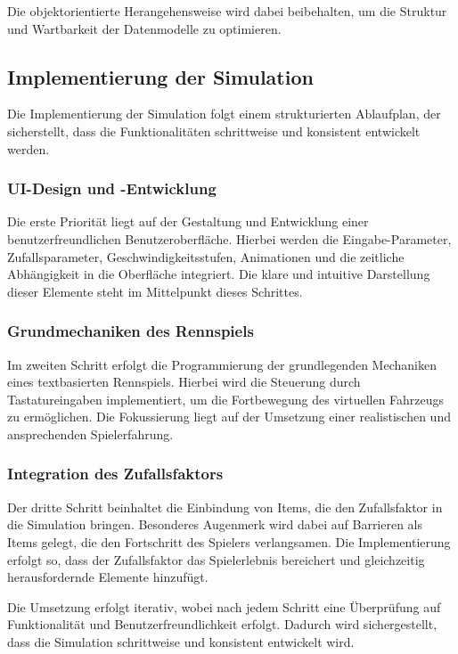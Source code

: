 \documentclass[hidelinks,12pt]{article}
\begin{document}
Die objektorientierte Herangehensweise wird dabei beibehalten, um die Struktur und Wartbarkeit der Datenmodelle zu optimieren.

\subsection{Implementierung der Simulation}
Die Implementierung der Simulation folgt einem strukturierten Ablaufplan, der sicherstellt, dass die Funktionalitäten schrittweise und konsistent entwickelt werden.

\subsubsection{UI-Design und -Entwicklung}
Die erste Priorität liegt auf der Gestaltung und Entwicklung einer benutzerfreundlichen Benutzeroberfläche. Hierbei werden die Eingabe-Parameter, Zufallsparameter, Geschwindigkeitsstufen, Animationen und die zeitliche Abhängigkeit in die Oberfläche integriert. Die klare und intuitive Darstellung dieser Elemente steht im Mittelpunkt dieses Schrittes.

\subsubsection{Grundmechaniken des Rennspiels}
Im zweiten Schritt erfolgt die Programmierung der grundlegenden Mechaniken eines textbasierten Rennspiels. Hierbei wird die Steuerung durch Tastatureingaben implementiert, um die Fortbewegung des virtuellen Fahrzeugs zu ermöglichen. Die Fokussierung liegt auf der Umsetzung einer realistischen und ansprechenden Spielerfahrung.

\subsubsection{Integration des Zufallsfaktors}
Der dritte Schritt beinhaltet die Einbindung von Items, die den Zufallsfaktor in die Simulation bringen. Besonderes Augenmerk wird dabei auf Barrieren als Items gelegt, die den Fortschritt des Spielers verlangsamen. Die Implementierung erfolgt so, dass der Zufallsfaktor das Spielerlebnis bereichert und gleichzeitig herausfordernde Elemente hinzufügt.

Die Umsetzung erfolgt iterativ, wobei nach jedem Schritt eine Überprüfung auf Funktionalität und Benutzerfreundlichkeit erfolgt. Dadurch wird sichergestellt, dass die Simulation schrittweise und konsistent entwickelt wird.
\end{document}
